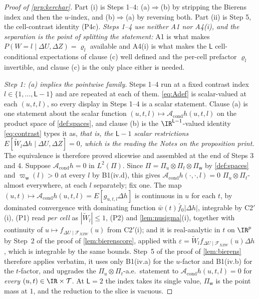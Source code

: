 \begin{proof}[Proof of \cref{prp:kerchar}]
Part (i) is Steps 1--4: (a)$\Rightarrow$(b) by stripping the Bierens index and then the $u$-index, and
(b)$\Rightarrow$(a) by reversing both. Part (ii) is Step 5, the cell-contrast identity (P4c).
\emph{Steps 1--4 use neither A1 nor A4(i), and the separation is the point of splitting the statement:}
A1 is what makes $P(W=l\mid\Delta U,\Delta Z)=\varrho_l$ available and A4(i) is what makes the $\mathsf L$
cell-conditional expectations of clause (c) well defined and the per-cell prefactor $\varrho_l$
invertible, and clause (c) is the only place either is needed.

\emph{Step 1: (a) implies the pointwise family.}
Steps 1--4 run at a fixed contrast index $l\in\{1,\dots,\mathsf L-1\}$ and are repeated at each of
them. \eqref{eq:Adef} is scalar-valued at each $(u,t,l)$, so every display in Steps 1--4 is a scalar
statement. Clause (a) is one statement about the scalar function
$(u,t,l)\mapsto\mathcal A_{\mathrm{cond}}h(u,t,l)$ on the product space of \cref{def:spaces}, and clause
(b) is the $\IR^{\mathsf L-1}$-valued identity \eqref{eq:contrast} types it as, \emph{that is, the
$\mathsf L-1$ scalar restrictions $E[\widetilde W_l\Delta h\mid\Delta U,\Delta Z]=0$, which is the reading
the Notes on the proposition print}. The equivalence is therefore proved slicewise and assembled at the
end of Steps 3 and 4.
Suppose $\mathcal A_{\mathrm{cond}}h=0$ in $L^{2}(\Pi)$. Since
$\Pi=\Pi_u\otimes\Pi_t\otimes\Pi_{\mathsf w}$ by \cref{def:spaces} and $\varpi_{\mathsf w}(l)>0$ at every
$l$ by B1(iv.d), this gives $\mathcal A_{\mathrm{cond}}h(\cdot,\cdot,l)=0$
$\Pi_u\otimes\Pi_t$-almost everywhere, at each $l$ separately; fix one. The map
$(u,t)\mapsto\mathcal A_{\mathrm{cond}}h(u,t,l)=E[g_{u,t,l}\Delta h]$ is continuous in $u$ for each $t$, by
dominated convergence with dominating function $\bar w(t)\bar f_0|\Delta h|$, integrable by C2$'$(i),
(P1) read \emph{per cell} as $|\widetilde W_l|\le1$, (P2) and \cref{lem:nusigma}(i), together with
continuity of
$u\mapsto f_{\Delta U\mid\mathcal F_{XZW}}(u)$ from C2$'$(i); and it is real-analytic in $t$ on $\IR^{p}$
by Step~2 of the proof of \cref{lem:bierenscore}, applied with $\varepsilon=\widetilde W_lf_{\Delta U\mid\mathcal F_{XZW}}(u)\Delta h$,
which is integrable by the same bounds. Step~5 of the proof of \cref{lem:bierens} therefore applies
verbatim, it uses only B1(iv.a) for the $u$-factor and B1(iv.b) for the $t$-factor, and upgrades
the $\Pi_u\otimes\Pi_t$-a.e.\ statement to $\mathcal A_{\mathrm{cond}}h(u,t,l)=0$ for \emph{every}
$(u,t)\in\IR\times\mathcal T$. At $\mathsf L=2$ the index takes its single value, $\Pi_{\mathsf w}$
is the point mass at $1$, and the reduction to the slice is vacuous.


\end{proof}

